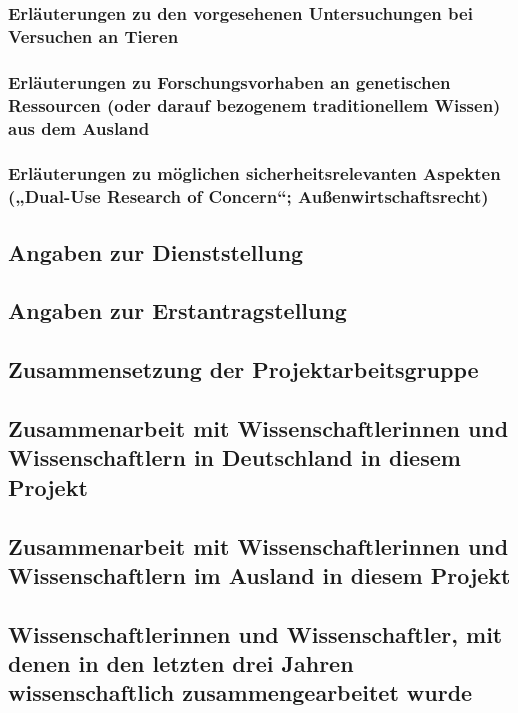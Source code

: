 \documentclass[de]{dfg-proposal}
\begin{document}
            \subsubsection{Erläuterungen zu den vorgesehenen Untersuchungen bei Versuchen an Tieren}

            \subsubsection{Erläuterungen zu Forschungsvorhaben an genetischen Ressourcen (oder darauf bezogenem traditionellem Wissen) aus dem Ausland}

            \subsubsection{Erläuterungen zu möglichen sicherheitsrelevanten Aspekten („Dual-Use Research of Concern“; Außenwirtschaftsrecht)}

        \subsection{Angaben zur Dienststellung}

        \subsection{Angaben zur Erstantragstellung}

        \subsection{Zusammensetzung der Projektarbeitsgruppe}

        \subsection{Zusammenarbeit mit Wissenschaftlerinnen und Wissenschaftlern in Deutschland in diesem Projekt}

        \subsection{Zusammenarbeit mit Wissenschaftlerinnen und Wissenschaftlern im Ausland in diesem Projekt}

        \subsection{Wissenschaftlerinnen und Wissenschaftler, mit denen in den letzten drei Jahren wissenschaftlich zusammengearbeitet wurde}
\end{document}
